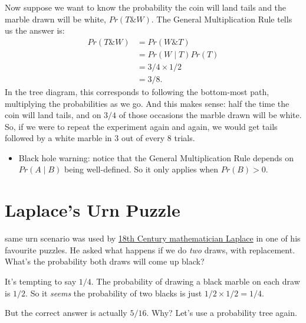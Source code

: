 \documentclass[justified]{tufte-book}
\newcommand{\given}{\mid}
\renewcommand{\wedge}{\mathbin{\&}}
\newcommand{\gt}{>}
\newcommand{\p}{Pr}
\newenvironment{warning}{\begin{itemize}\item[\faBan]}{\end{itemize}}
\theoremstyle{definition}
\theoremstyle{definition}
\theoremstyle{definition}
\theoremstyle{remark}
\begin{document}
Now suppose we want to know the probability the coin will land tails and the marble drawn will be white, \(\p(T \wedge W)\). The General Multiplication Rule tells us the answer is:
\[
  \begin{aligned}
    \p(T \wedge W) &= \p(W \wedge T)\\
                   &= \p(W \given T) \p(T)\\
                   &= 3/4 \times 1/2\\
                   &= 3/8.
  \end{aligned}
\]
In the tree diagram, this corresponds to following the bottom-most path, multiplying the probabilities as we go. And this makes sense: half the time the coin will land tails, and on \(3/4\) of those occasions the marble drawn will be white. So, if we were to repeat the experiment again and again, we would get tails followed by a white marble in \(3\) out of every \(8\) trials.

\begin{warning}
Black hole warning: notice that the General Multiplication Rule depends
on \(\p(A \given B)\) being well-defined. So it only applies when
\(\p(B) \gt 0\).
\end{warning}

\hypertarget{laplaces-urn-puzzle}{%
\section{Laplace's Urn Puzzle}\label{laplaces-urn-puzzle}}

 same urn scenario was used by \protect\hyperlink{strength}{18th Century mathematician Laplace} in one of his favourite puzzles. He asked what happens if we do \emph{two} draws, with replacement. What's the probability both draws will come up black?

It's tempting to say \(1/4\). The probability of drawing a black marble on each draw is \(1/2\). So it \emph{seems} the probability of two blacks is just \(1/2 \times 1/2 = 1/4\).

But the correct answer is actually \(5/16\). Why? Let's use a probability tree again.
\end{document}
